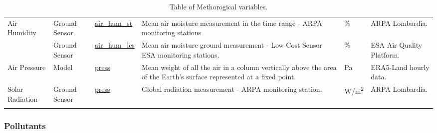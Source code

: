 \begin{center}
\begin{longtable}{ |p{2cm}|p{1.5cm}|p{2.3cm}|p{4cm}|p{1cm}|p{2cm}| }
\multirow{2}{4em}{Air Humidity} & Ground \newline Sensor  & \underline{air\_hum\_st} & Mean air moisture measurement in the time range - ARPA monitoring stations & \% & ARPA \newline Lombardia.\\ 
& Ground \newline Sensor  & \underline{air\_hum\_lcs} &  Mean air moisture ground measurement - Low Cost Sensor ESA monitoring stations. & \% & ESA Air Quality Platform.\\ \hline

\multirow{1}{4em}{Air Pressure} & Model   & \underline{press} & Mean weight of all the air in a column vertically above the area of the Earth's surface represented at a fixed point. & Pa & ERA5-Land hourly data.\\ \hline

\multirow{1}{4em}{Solar Radiation} & Ground \newline Sensor  & \underline{press} & Global radiation measurement - ARPA monitoring station. & W/m\textsuperscript{2} & ARPA \newline Lombardia.\\ \hline

\hline
\caption{Table of Methorogical variables.}

\end{longtable}
\end{center}

\subsubsection{Pollutants}


